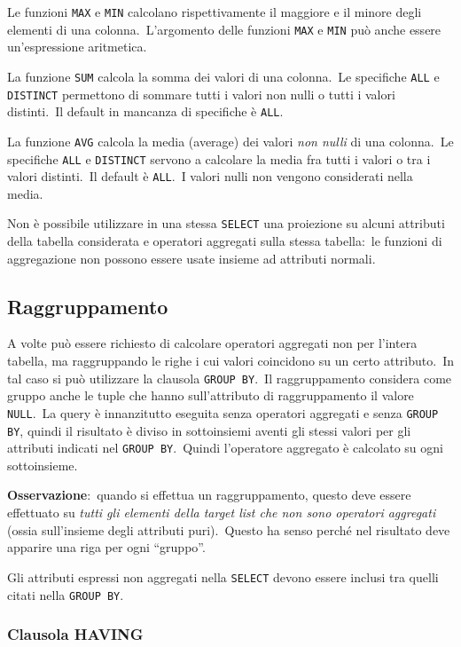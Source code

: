 Le funzioni \texttt{MAX} e \texttt{MIN} calcolano rispettivamente il maggiore e il minore degli elementi di una colonna.\
L'argomento delle funzioni \texttt{MAX} e \texttt{MIN} può anche essere un'espressione aritmetica.\

La funzione \texttt{SUM} calcola la somma dei valori di una colonna.\
Le specifiche \texttt{ALL} e \texttt{DISTINCT} permettono di sommare tutti i valori non nulli o tutti i valori distinti.\
Il default in mancanza di specifiche è \texttt{ALL}.

La funzione \texttt{AVG} calcola la media (average) dei valori \textit{non nulli} di una colonna.\
Le specifiche \texttt{ALL} e \texttt{DISTINCT} servono a calcolare la media fra tutti i valori o tra i valori distinti.\
Il default è \texttt{ALL}.\
I valori nulli non vengono considerati nella media.\

\noindent Non è possibile utilizzare in una stessa \texttt{SELECT} una proiezione su alcuni attributi della tabella considerata e operatori aggregati sulla stessa tabella:\ le funzioni di aggregazione non possono essere usate insieme ad attributi normali.\

\subsection{Raggruppamento}

A volte può essere richiesto di calcolare operatori aggregati non per l'intera tabella, ma raggruppando le righe i cui valori coincidono su un certo attributo.\
In tal caso si può utilizzare la clausola \texttt{GROUP BY}.\
Il raggruppamento considera come gruppo anche le tuple che hanno sull'attributo di raggruppamento il valore \texttt{NULL}.\
La query è innanzitutto eseguita senza operatori aggregati e senza \texttt{GROUP BY}, quindi il risultato è diviso in sottoinsiemi aventi gli stessi valori per gli attributi indicati nel \texttt{GROUP BY}.\
Quindi l'operatore aggregato è calcolato su ogni sottoinsieme.\

\textbf{Osservazione}:\ quando si effettua un raggruppamento, questo deve essere effettuato su \textit{tutti gli elementi della target list che non sono operatori aggregati} (ossia sull'insieme degli attributi puri).\
Questo ha senso perché nel risultato deve apparire una riga per ogni ``gruppo''.

Gli attributi espressi non aggregati nella \texttt{SELECT} devono essere inclusi tra quelli citati nella \texttt{GROUP BY}.

\subsubsection{Clausola HAVING}

